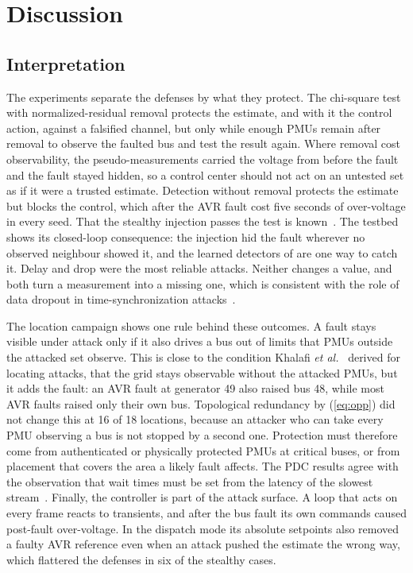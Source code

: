 \documentclass[journal]{IEEEtran}
\begin{document}
\section{Discussion}
\label{sec:disc}

\subsection{Interpretation}

The experiments separate the defenses by what they protect. The chi-square test with normalized-residual removal protects the estimate, and with it the control action, against a falsified channel, but only while enough PMUs remain after removal to observe the faulted bus and test the result again. Where removal cost observability, the pseudo-measurements carried the voltage from before the fault and the fault stayed hidden, so a control center should not act on an untested set as if it were a trusted estimate. Detection without removal protects the estimate but blocks the control, which after the AVR fault cost five seconds of over-voltage in every seed. That the stealthy injection passes the test is known~\cite{liu2009fdi}. The testbed shows its closed-loop consequence: the injection hid the fault wherever no observed neighbour showed it, and the learned detectors of \cite{chen2022datadriven,bhattacharjee2023deep} are one way to catch it. Delay and drop were the most reliable attacks. Neither changes a value, and both turn a measurement into a missing one, which is consistent with the role of data dropout in time-synchronization attacks~\cite{zadsar2023preventing,shereen2024topology}.

The location campaign shows one rule behind these outcomes. A fault stays visible under attack only if it also drives a bus out of limits that PMUs outside the attacked set observe. This is close to the condition Khalafi \emph{et al.}~\cite{khalafi2022intrusion} derived for locating attacks, that the grid stays observable without the attacked PMUs, but it adds the fault: an AVR fault at generator 49 also raised bus 48, while most AVR faults raised only their own bus. Topological redundancy by (\ref{eq:opp}) did not change this at 16 of 18 locations, because an attacker who can take every PMU observing a bus is not stopped by a second one. Protection must therefore come from authenticated or physically protected PMUs at critical buses, or from placement that covers the area a likely fault affects. The PDC results agree with the observation that wait times must be set from the latency of the slowest stream~\cite{pourramezan2021pdc}. Finally, the controller is part of the attack surface. A loop that acts on every frame reacts to transients, and after the bus fault its own commands caused post-fault over-voltage. In the dispatch mode its absolute setpoints also removed a faulty AVR reference even when an attack pushed the estimate the wrong way, which flattered the defenses in six of the stealthy cases.
\end{document}
